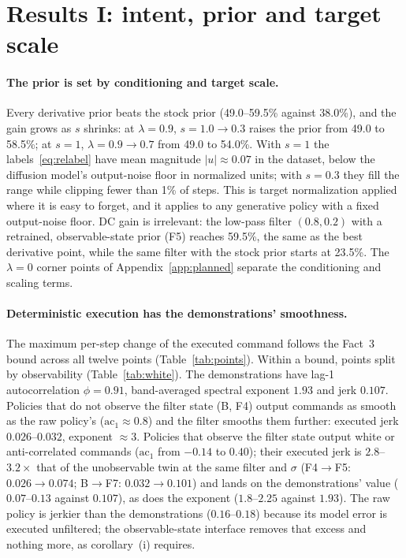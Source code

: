 \documentclass{article}
\begin{document}
\section{Results I: intent, prior and target scale}
\label{sec:intent}

\paragraph{The prior is set by conditioning and target scale.} Every derivative prior beats the stock prior (49.0--59.5\% against 38.0\%), and the gain grows as $s$ shrinks: at $\lambda=0.9$, $s=1.0\to0.3$ raises the prior from 49.0 to 58.5\%; at $s=1$, $\lambda=0.9\to0.7$ from 49.0 to 54.0\%. With $s=1$ the labels~\eqref{eq:relabel} have mean magnitude $|u|\approx0.07$ in the dataset, below the diffusion model's output-noise floor in normalized units; with $s=0.3$ they fill the range while clipping fewer than 1\% of steps. This is target normalization applied where it is easy to forget, and it applies to any generative policy with a fixed output-noise floor. DC gain is irrelevant: the low-pass filter $(0.8,0.2)$ with a retrained, observable-state prior (F5) reaches 59.5\%, the same as the best derivative point, while the same filter with the stock prior starts at 23.5\%. The $\lambda=0$ corner points of Appendix~\ref{app:planned} separate the conditioning and scaling terms.

\paragraph{Deterministic execution has the demonstrations' smoothness.} The maximum per-step change of the executed command follows the Fact~3 bound across all twelve points (Table~\ref{tab:points}). Within a bound, points split by observability (Table~\ref{tab:white}). The demonstrations have lag-1 autocorrelation $\phi=0.91$, band-averaged spectral exponent $1.93$ and jerk $0.107$. Policies that do not observe the filter state (B, F4) output commands as smooth as the raw policy's ($\mathrm{ac}_1\approx0.8$) and the filter smooths them further: executed jerk $0.026$--$0.032$, exponent $\approx3$. Policies that observe the filter state output white or anti-correlated commands ($\mathrm{ac}_1$ from $-0.14$ to $0.40$); their executed jerk is $2.8$--$3.2\times$ that of the unobservable twin at the same filter and $\sigma$ (F4$\to$F5: $0.026\to0.074$; B$\to$F7: $0.032\to0.101$) and lands on the demonstrations' value ($0.07$--$0.13$ against $0.107$), as does the exponent ($1.8$--$2.25$ against $1.93$). The raw policy is jerkier than the demonstrations ($0.16$--$0.18$) because its model error is executed unfiltered; the observable-state interface removes that excess and nothing more, as corollary~(i) requires.
\end{document}
